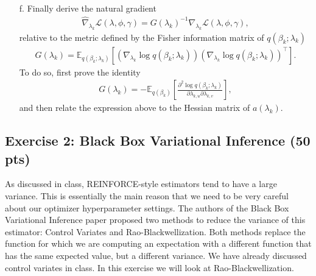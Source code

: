 \documentclass [12pt]{article}
\newcommand{\E}{\ensuremath{\mathbb{E}}}
\begin{document}
\begin{itemize}
\item[f.] Finally derive the natural gradient 
\begin{align*}
	\hat{\nabla}_{\lambda_k} \mathcal{L}(\lambda, \phi, \gamma)
    =
    G(\lambda_k)^{-1}
    \nabla_{\lambda_{k}}
    \mathcal{L}(\lambda, \phi, \gamma)
    ,
\end{align*}
relative to the metric defined by the Fisher information matrix of $q(\beta_k ; \lambda_k)$
\begin{align*}
	G(\lambda_k) 
    = 
    \E_{q(\beta_k ; \lambda_k)}
    \left[
    	\left(
        	\nabla_{\lambda_k} \log q(\beta_k ; \lambda_k)
        \right)
    	\left(
        	\nabla_{\lambda_k} \log q(\beta_k ; \lambda_k)
        \right)^\top
    \right].
\end{align*}
To do so, first prove the identity
\begin{align*}
	G(\lambda_k)
    =
	-\E_{q(\beta_k)}
    \left[
    	\frac{\partial^2 \log q(\beta_k ; \lambda_k)}{\partial \lambda_{k,u} \partial \lambda_{k,v}}
    \right],
\end{align*}
and then relate the expression above to the Hessian matrix of $a(\lambda_k)$.
\end{itemize}

\subsection*{Exercise 2: Black Box Variational Inference (50 pts)}

As discussed in class, REINFORCE-style estimators tend to have a large variance. This is essentially the main reason
that we need to be very careful about our optimizer hyperparameter settings. The authors of the Black Box Variational
Inference paper proposed two methods to reduce the variance of this estimator: Control Variates and
Rao-Blackwellization. Both methods replace the function for which we are computing an expectation with a different
function that has the same expected value, but a different variance. We have already discussed control variates in
class. In this exercise we will look at Rao-Blackwellization.
\end{document}
